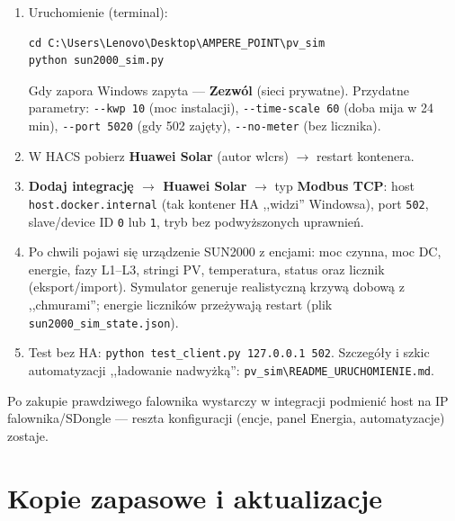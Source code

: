 \documentclass[11pt,a4paper]{article}
\begin{document}
\begin{enumerate}
\item Uruchomienie (terminal):
\begin{lstlisting}
cd C:\Users\Lenovo\Desktop\AMPERE_POINT\pv_sim
python sun2000_sim.py
\end{lstlisting}
Gdy zapora Windows zapyta --- \textbf{Zezwól} (sieci prywatne). Przydatne parametry: \texttt{-{}-kwp 10} (moc instalacji), \texttt{-{}-time-scale 60} (doba mija w 24 min), \texttt{-{}-port 5020} (gdy 502 zajęty), \texttt{-{}-no-meter} (bez licznika).
\item W HACS pobierz \textbf{Huawei Solar} (autor wlcrs) $\to$ restart kontenera.
\item \textbf{Dodaj integrację $\to$ Huawei Solar} $\to$ typ \textbf{Modbus TCP}: host \texttt{host.docker.internal} (tak kontener HA ,,widzi'' Windowsa), port \texttt{502}, slave/device ID \texttt{0} lub \texttt{1}, tryb bez podwyższonych uprawnień.
\item Po chwili pojawi się urządzenie SUN2000 z encjami: moc czynna, moc DC, energie, fazy L1--L3, stringi PV, temperatura, status oraz licznik (eksport/import). Symulator generuje realistyczną krzywą dobową z ,,chmurami''; energie liczników przeżywają restart (plik \texttt{sun2000\_sim\_state.json}).
\item Test bez HA: \texttt{python test\_client.py 127.0.0.1 502}. Szczegóły i szkic automatyzacji ,,ładowanie nadwyżką'': \texttt{pv\_sim\textbackslash README\_URUCHOMIENIE.md}.
\end{enumerate}

Po zakupie prawdziwego falownika wystarczy w integracji podmienić host na IP falownika/SDongle --- reszta konfiguracji (encje, panel Energia, automatyzacje) zostaje.

\section{Kopie zapasowe i aktualizacje}
\label{sec:backup}
\end{document}
